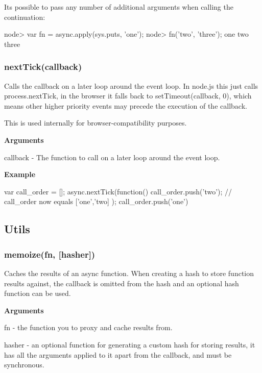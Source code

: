 It\textquotesingle{}s possible to pass any number of additional arguments when calling the continuation\+: \begin{DoxyVerb}node> var fn = async.apply(sys.puts, 'one');
node> fn('two', 'three');
one
two
three
\end{DoxyVerb}






\label{_nextTick}%
 \subsubsection*{next\+Tick(callback)}

Calls the callback on a later loop around the event loop. In node.\+js this just calls process.\+next\+Tick, in the browser it falls back to set\+Timeout(callback, 0), which means other higher priority events may precede the execution of the callback.

This is used internally for browser-\/compatibility purposes.

{\bfseries Arguments}


\begin{DoxyItemize}
\item callback -\/ The function to call on a later loop around the event loop.
\end{DoxyItemize}

{\bfseries Example} \begin{DoxyVerb}var call_order = [];
async.nextTick(function(){
    call_order.push('two');
    // call_order now equals ['one','two]
});
call_order.push('one')
\end{DoxyVerb}


\subsection*{Utils}

\label{_memoize}%
 \subsubsection*{memoize(fn, \mbox{[}hasher\mbox{]})}

Caches the results of an async function. When creating a hash to store function results against, the callback is omitted from the hash and an optional hash function can be used.

{\bfseries Arguments}


\begin{DoxyItemize}
\item fn -\/ the function you to proxy and cache results from.
\item hasher -\/ an optional function for generating a custom hash for storing results, it has all the arguments applied to it apart from the callback, and must be synchronous.
\end{DoxyItemize}

